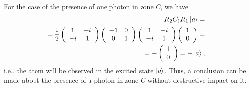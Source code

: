 For the case of the presence of one photon in zone $C$, we have
\begin{eqnarray}
  R_2 C_1 R_1 \ket{a} =
  \nonumber \\
  =
  \frac{1}{2}
  \left(
  \begin{array} {cc}
    1 & -i
    \\
    -i & 1 
  \end{array}
  \right)
  \left(
  \begin{array} {cc}
    -1 & 0
    \\
    0 & 1 
  \end{array}
  \right)
  \left(
  \begin{array} {cc}
    1 & -i
    \\
    -i & 1 
  \end{array}
  \right)
  \left(
  \begin{array} {c}
    1
    \\
    0
  \end{array}
  \right) =
  \nonumber \\
  =
  - 
  \left(
  \begin{array} {c}
    1
    \\
    0
  \end{array}
  \right) =
  - \ket{a},
  \nonumber
\end{eqnarray}
i.e., the atom will be observed in the excited state $\ket{a}$. Thus, a conclusion can be made about the presence of a photon in zone $C$ without destructive impact on it.